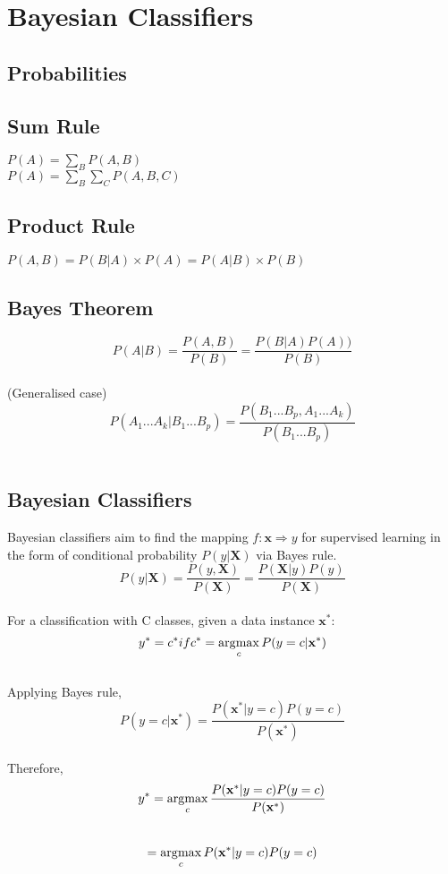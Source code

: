 
\section{Bayesian Classifiers}
\subsection*{Probabilities}
\subsection*{Sum Rule}
$P(A) = \sum_B P(A,B)$\\
$P(A) = \sum_B\sum_C P(A,B,C)$\\
\subsection*{Product Rule}
$P(A,B) = P(B|A)\times P(A) = P(A|B)\times P(B)$\\
\subsection*{Bayes Theorem}
\[P(A|B) = \frac{P(A,B)}{P(B)} = \frac{P(B|A)P(A))}{P(B)}\]\\
(Generalised case)\\
\[P(A_1...A_k|B_1...B_p) = \frac{P(B_1...B_p,A_1...A_k)}{P(B_1...B_p)}\]\\
\subsection*{Bayesian Classifiers}
Bayesian classifiers aim to find the mapping $f: \mathbf{x} \Rightarrow y$
for supervised learning in the form of conditional probability $P(y|\mathbf{X})$
via Bayes rule.
\[P(y|\mathbf{X}) = \frac{P(y, \mathbf{X})}{P(\mathbf{X})} = \frac{P(\mathbf{X}|y)P(y)}{P(\mathbf{X})}\]\\
For a classification with C classes, given a data instance $\mathbf{x^*}$:\\
\[y^* = c^* if c^* = \operatorname*{\arg\!\max}_c P(y=c|\mathbf{x^*})\]\\
Applying Bayes rule,\\
\[P(y=c|\mathbf{x^*}) = \frac{P(\mathbf{x^*}| y=c)P(y=c)}{P(\mathbf{x^*})}\]\\
Therefore,\\
\[y^* = \operatorname*{\arg\!\max}_c \frac{P(\mathbf{x^*}| y=c)P(y=c)}{P(\mathbf{x^*})}\]\\
\[= \operatorname*{\arg\!\max}_c P(\mathbf{x^*}| y=c)P(y=c)\]\\

